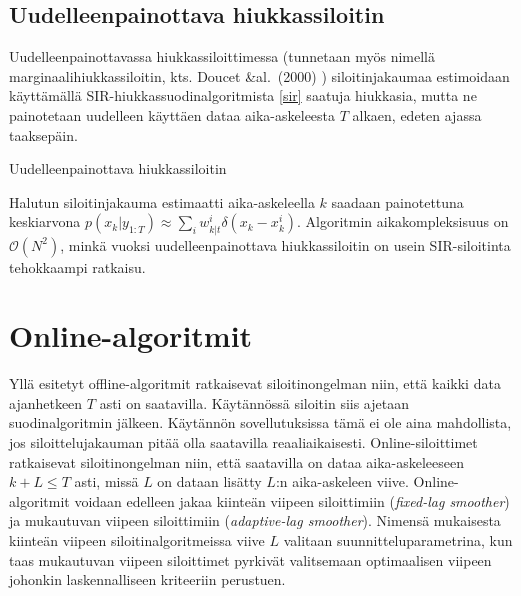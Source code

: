 \documentclass[
  12pt,
  a4paper, twoside]{book}
\begin{document}
\subsection{Uudelleenpainottava hiukkassiloitin}

Uudelleenpainottavassa hiukkassiloittimessa (tunnetaan myös nimellä marginaalihiukkassiloitin, kts. Doucet \&al.~(2000) \citep{Doucet-2000}) siloitinjakaumaa estimoidaan käyttämällä SIR-hiukkassuodinalgoritmista \ref{sir} saatuja hiukkasia, mutta ne painotetaan uudelleen käyttäen dataa aika-askeleesta \(T\) alkaen, edeten ajassa taaksepäin.

\begin{algorithm}[H]
\label{rwps}
\DontPrintSemicolon
\SetAlgoShortEnd
{}
\caption{Uudelleenpainottava hiukkassiloitin}
\end{algorithm}

Halutun siloitinjakauma estimaatti aika-askeleella \(k\) saadaan painotettuna keskiarvona \(p(x_k|y_{1:T}) \approx \sum_i w_{k|t}^i \delta (x_k-x_k^i)\). Algoritmin aikakompleksisuus on \(\mathcal{O}(N^2)\), minkä vuoksi uudelleenpainottava hiukkassiloitin on usein SIR-siloitinta tehokkaampi ratkaisu.

\section{Online-algoritmit}

Yllä esitetyt offline-algoritmit ratkaisevat siloitinongelman niin, että kaikki data ajanhetkeen \(T\) asti on saatavilla. Käytännössä siloitin siis ajetaan suodinalgoritmin jälkeen. Käytännön sovellutuksissa tämä ei ole aina mahdollista, jos siloittelujakauman pitää olla saatavilla reaaliaikaisesti. Online-siloittimet ratkaisevat siloitinongelman niin, että saatavilla on dataa aika-askeleeseen \(k+L \le T\) asti, missä \(L\) on dataan lisätty \(L\):n aika-askeleen viive. Online-algoritmit voidaan edelleen jakaa kiinteän viipeen siloittimiin (\emph{fixed-lag smoother}) ja mukautuvan viipeen siloittimiin (\emph{adaptive-lag smoother}). Nimensä mukaisesta kiinteän viipeen siloitinalgoritmeissa viive \(L\) valitaan suunnitteluparametrina, kun taas mukautuvan viipeen siloittimet pyrkivät valitsemaan optimaalisen viipeen johonkin laskennalliseen kriteeriin perustuen.
\end{document}
